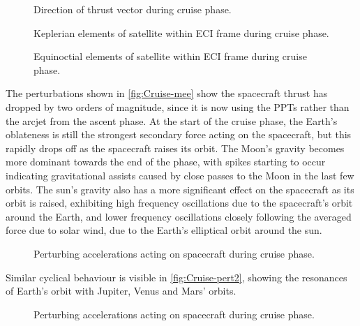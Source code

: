 \begin{figure}
\caption{Direction of thrust vector during cruise phase.}
\label{fig:Cruise-thrust}
\centering
\def\svgwidth{\figurewidth}

\end{figure}

\begin{figure}
\caption{Keplerian elements of satellite within ECI frame during cruise phase.}
\label{fig:Cruise-kep}
\centering
\def\svgwidth{\figurewidth}

\end{figure}

\begin{figure}
\caption{Equinoctial elements of satellite within ECI frame during cruise phase.}
\label{fig:Cruise-mee}
\centering
\def\svgwidth{\figurewidth}

\end{figure}

The perturbations shown in \autoref{fig:Cruise-mee} show the spacecraft thrust has dropped by two orders of magnitude, since it is now using the PPTs rather than the arcjet from the ascent phase. At the start of the cruise phase, the Earth's oblateness is still the strongest secondary force acting on the spacecraft, but this rapidly drops off as the spacecraft raises its orbit. The Moon's gravity becomes more dominant towards the end of the phase, with spikes starting to occur indicating gravitational assists caused by close passes to the Moon in the last few orbits. The sun's gravity also has a more significant effect on the spacecraft as its orbit is raised, exhibiting high frequency oscillations due to the spacecraft's orbit around the Earth, and lower frequency oscillations closely following the averaged force due to solar wind, due to the Earth's elliptical orbit around the sun.

\begin{figure}
\caption{Perturbing accelerations acting on spacecraft during cruise phase.}
\label{fig:Cruise-pert}
\centering
\def\svgwidth{\figurewidth}

\end{figure}

Similar cyclical behaviour is visible in \autoref{fig:Cruise-pert2}, showing the resonances of Earth's orbit with Jupiter, Venus and Mars' orbits.

\begin{figure}
\caption{Perturbing accelerations acting on spacecraft during cruise phase.}
\label{fig:Cruise-pert2}
\centering
\def\svgwidth{\figurewidth}

\end{figure}

